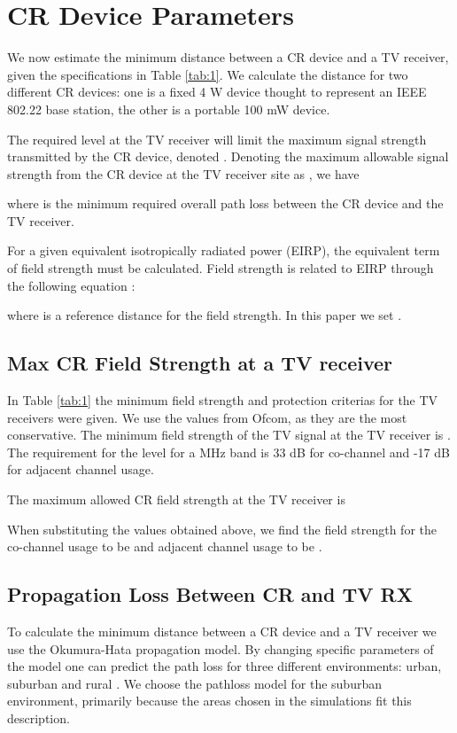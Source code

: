 \documentclass[journal,11pt,draftclsnofoot,onecolumn]{IEEEtran}
\begin{document}
\section{CR Device Parameters}
\label{sec:cr-param}
We now estimate the minimum distance between a CR device and a TV receiver, given the specifications in Table \ref{tab:1}. We calculate the distance for two different CR devices: one is a fixed 4 W device thought to represent an IEEE 802.22 base station, the other is a portable 100 mW device.

The required  level at the TV receiver will limit the maximum signal strength transmitted by the CR device, denoted . Denoting the maximum allowable signal strength from the CR device at the TV receiver site as , we have

where  is the minimum required overall path loss between the CR device and the TV receiver.

For a given equivalent isotropically radiated power (EIRP), the equivalent term of field strength must be calculated. Field strength is related to EIRP through the following equation \cite{ntia}:

where  is a reference distance for the field strength. In this paper we set . 

\subsection{Max CR Field Strength at a TV receiver}
In Table \ref{tab:1} the minimum field strength and protection criterias for the TV receivers were given. We use the values from Ofcom, as they are the most conservative. The minimum field strength of the TV signal at the TV receiver is . The requirement for the  level for a  MHz band is 33 dB for co-channel and -17 dB for adjacent channel usage.

The maximum allowed CR field strength at the TV receiver is

When substituting the values obtained above, we find the field strength for the co-channel usage to be  and adjacent channel usage to be .


\subsection{Propagation Loss Between CR and TV RX}
To calculate the minimum distance between a CR device and a TV receiver we use the Okumura-Hata propagation model. By changing specific parameters of the model one can predict the path loss for three different environments: urban, suburban and rural \cite{antenna}. We choose the pathloss model for the suburban environment, primarily because the areas chosen in the simulations fit this description.
\end{document}

